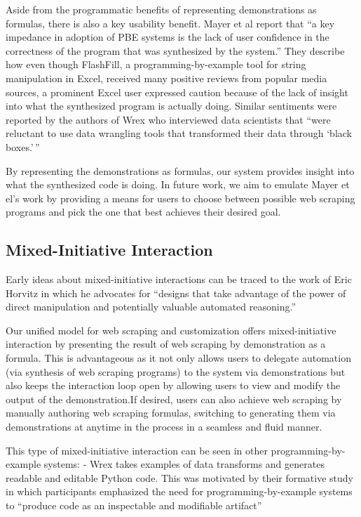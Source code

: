\documentclass[sigconf,10pt]{acmart}
\begin{document}
Aside from the programmatic benefits of representing demonstrations as
formulas, there is also a key usability benefit. Mayer et al report that
``a key impedance in adoption of PBE systems is the lack of user
confidence in the correctness of the program that was synthesized by the
system.'' They describe how even though FlashFill, a
programming-by-example tool for string manipulation in Excel, received
many positive reviews from popular media sources, a prominent Excel user
expressed caution because of the lack of insight into what the
synthesized program is actually doing. Similar sentiments were reported
by the authors of Wrex who interviewed data scientists that ``were
reluctant to use data wrangling tools that transformed their data
through `black boxes.'\,''

By representing the demonstrations as formulas, our system provides
insight into what the synthesized code is doing. In future work, we aim
to emulate Mayer et el's work by providing a means for users to choose
between possible web scraping programs and pick the one that best
achieves their desired goal.

\hypertarget{mixed-initiative-interaction}{%
\subsection{Mixed-Initiative
Interaction}\label{mixed-initiative-interaction}}

Early ideas about mixed-initiative interactions can be traced to the
work of Eric Horvitz in which he advocates for ``designs that take
advantage of the power of direct manipulation and potentially valuable
automated reasoning.''

Our unified model for web scraping and customization offers
mixed-initiative interaction by presenting the result of web scraping by
demonstration as a formula. This is advantageous as it not only allows
users to delegate automation (via synthesis of web scraping programs) to
the system via demonstrations but also keeps the interaction loop open
by allowing users to view and modify the output of the demonstration.If
desired, users can also achieve web scraping by manually authoring web
scraping formulas, switching to generating them via demonstrations at
anytime in the process in a seamless and fluid manner.

This type of mixed-initiative interaction can be seen in other
programming-by-example systems: - Wrex takes examples of data transforms
and generates readable and editable Python code. This was motivated by
their formative study in which participants emphasized the need for
programming-by-example systems to ``produce code as an inspectable and
modifiable artifact''
\end{document}
